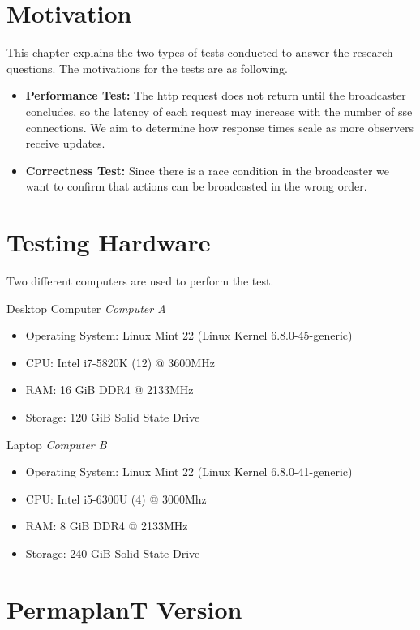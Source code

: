 \documentclass[final,oneside]{vutinfth}
\begin{document}
\section{Motivation}

This chapter explains the two types of tests conducted to answer the research questions.
The motivations for the tests are as following.

\begin{itemize}
    \item \textbf{Performance Test:} The \gls{http} request does not return until the broadcaster concludes, so the latency of each request may increase with the number of \gls{sse} connections.
    We aim to determine how response times scale as more observers receive updates.
    \item \textbf{Correctness Test:} Since there is a race condition in the broadcaster we want to confirm that actions can be broadcasted in the wrong order. 
\end{itemize}

\section{Testing Hardware}

Two different computers are used to perform the test.

Desktop Computer \textit{Computer A}
\begin{itemize}
  \item Operating System: Linux Mint 22 (Linux Kernel 6.8.0-45-generic)
  \item CPU: Intel i7-5820K (12) @ 3600MHz
  \item RAM: 16 GiB DDR4 @ 2133MHz
  \item Storage: 120 GiB Solid State Drive
\end{itemize}

Laptop \textit{Computer B}
\begin{itemize}
  \item Operating System: Linux Mint 22 (Linux Kernel 6.8.0-41-generic)
  \item CPU: Intel i5-6300U (4) @ 3000Mhz
  \item RAM: 8 GiB DDR4 @ 2133MHz
  \item Storage: 240 GiB Solid State Drive
\end{itemize}

\section{PermaplanT Version}
\end{document}
